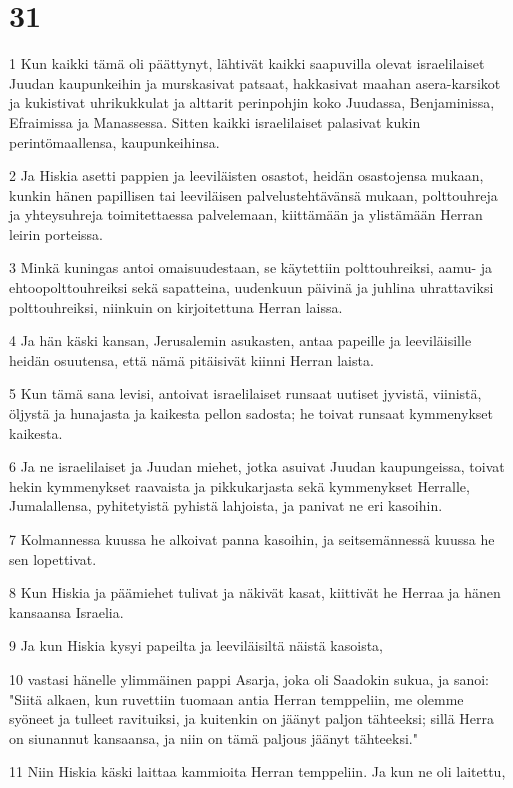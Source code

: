 \chapter{31}

\par 1 Kun kaikki tämä oli päättynyt, lähtivät kaikki saapuvilla olevat israelilaiset Juudan kaupunkeihin ja murskasivat patsaat, hakkasivat maahan asera-karsikot ja kukistivat uhrikukkulat ja alttarit perinpohjin koko Juudassa, Benjaminissa, Efraimissa ja Manassessa. Sitten kaikki israelilaiset palasivat kukin perintömaallensa, kaupunkeihinsa.
\par 2 Ja Hiskia asetti pappien ja leeviläisten osastot, heidän osastojensa mukaan, kunkin hänen papillisen tai leeviläisen palvelustehtävänsä mukaan, polttouhreja ja yhteysuhreja toimitettaessa palvelemaan, kiittämään ja ylistämään Herran leirin porteissa.
\par 3 Minkä kuningas antoi omaisuudestaan, se käytettiin polttouhreiksi, aamu- ja ehtoopolttouhreiksi sekä sapatteina, uudenkuun päivinä ja juhlina uhrattaviksi polttouhreiksi, niinkuin on kirjoitettuna Herran laissa.
\par 4 Ja hän käski kansan, Jerusalemin asukasten, antaa papeille ja leeviläisille heidän osuutensa, että nämä pitäisivät kiinni Herran laista.
\par 5 Kun tämä sana levisi, antoivat israelilaiset runsaat uutiset jyvistä, viinistä, öljystä ja hunajasta ja kaikesta pellon sadosta; he toivat runsaat kymmenykset kaikesta.
\par 6 Ja ne israelilaiset ja Juudan miehet, jotka asuivat Juudan kaupungeissa, toivat hekin kymmenykset raavaista ja pikkukarjasta sekä kymmenykset Herralle, Jumalallensa, pyhitetyistä pyhistä lahjoista, ja panivat ne eri kasoihin.
\par 7 Kolmannessa kuussa he alkoivat panna kasoihin, ja seitsemännessä kuussa he sen lopettivat.
\par 8 Kun Hiskia ja päämiehet tulivat ja näkivät kasat, kiittivät he Herraa ja hänen kansaansa Israelia.
\par 9 Ja kun Hiskia kysyi papeilta ja leeviläisiltä näistä kasoista,
\par 10 vastasi hänelle ylimmäinen pappi Asarja, joka oli Saadokin sukua, ja sanoi: "Siitä alkaen, kun ruvettiin tuomaan antia Herran temppeliin, me olemme syöneet ja tulleet ravituiksi, ja kuitenkin on jäänyt paljon tähteeksi; sillä Herra on siunannut kansaansa, ja niin on tämä paljous jäänyt tähteeksi."
\par 11 Niin Hiskia käski laittaa kammioita Herran temppeliin. Ja kun ne oli laitettu,
